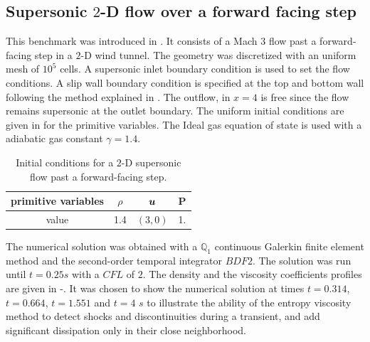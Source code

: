 \subsection{Supersonic $2$-D flow over a forward facing step} \label{sec:2d-forward-facing-step}
This benchmark was introduced in \cite{FFS}. It consists of a Mach 3 flow past a forward-facing step in a $2$-D wind tunnel. The geometry  was discretized with an uniform mesh of $10^5$ cells. A supersonic inlet boundary condition is used to set the flow conditions. A slip wall boundary condition is specified at the top and bottom wall following the method explained in . The outflow, in $x=4$ is free since the flow remains supersonic at the outlet boundary. \newpage The uniform initial conditions are given in  for the primitive variables. The Ideal gas equation of state is used with a adiabatic gas constant $\gamma = 1.4$.
\begin{table}[H] 
\caption{\label{tb:ic-forward-facing} Initial conditions for a $2$-D supersonic flow past a forward-facing step.}
\begin{center}
\begin{tabular}{|c|c|c|c|}
\hline
 primitive variables   & $\rho$ & $\boldsymbol u$ & P \\ \hline
value & 1.4 & $(3,0)$ & 1.\\ \hline
\end{tabular}
\end{center}
\nonumber
\end{table}
The numerical solution was obtained with a $\mathbb Q_1$ continuous Galerkin finite element method and the second-order temporal integrator $BDF2$. The solution was run until $t=0.25s$ with a $CFL$ of $2$. The density and the viscosity coefficients profiles are given in -. It was chosen to show the numerical solution at times $t=0.314$, $t=0.664$, $t=1.551$ and $t=4$ $s$ to illustrate the ability of the entropy viscosity method to detect shocks and discontinuities during a transient, and add significant dissipation only in their close neighborhood. 
